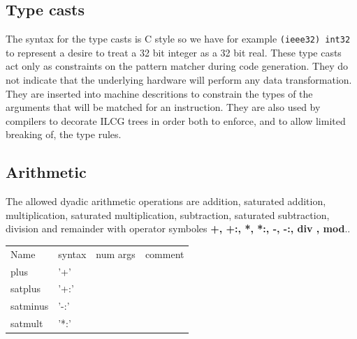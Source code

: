 {{\subsection{Type casts}

The syntax for the type casts is C style so we have for example \texttt{(ieee32)
int32} to represent a desire to treat a 32 bit integer as a 32 bit
real. These type casts act only as constraints on the pattern matcher during
code generation. They do not indicate that the underlying hardware will perform any data transformation. They
are inserted into machine descritions to constrain the types of the
arguments that will be matched for an instruction. They are also used
by compilers to decorate ILCG trees in order both to enforce, and
to allow limited breaking of, the type rules.


\subsection{Arithmetic}

The allowed dyadic arithmetic operations are addition, saturated addition,
multiplication, saturated multiplication, subtraction, saturated subtraction,
division and remainder with operator symboles \textbf{+, +:, {*},
{*}:, -, -:, div , mod}..
 \begin{table}[t]
\centering
\begin{tabular}{llll}
Name & syntax & num args& comment\\ 
plus & '+'&&\\
 satplus & '+:'&&\\
 satminus & '-:'&&\\
 satmult &'*:'&&\\
 

\end{tabular}
\end{table}}}
